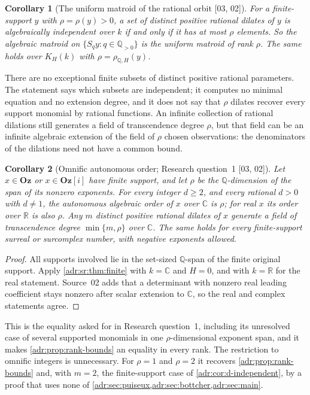 \documentclass[11pt,letterpaper]{article}
\numberwithin{equation}{section}
\newtheorem{corollary}[corollary]{Corollary}
\theoremstyle{definition}
\theoremstyle{remark}
\newcommand{\Oz}{\mathbf{Oz}}
\newcommand{\Goz}{\mathbf{Oz}[i]}
\newcommand{\C}{\mathbb C}
\newcommand{\R}{\mathbb R}
\newcommand{\Q}{\mathbb Q}
\newcommand{\src}[1]{\textup{[#1]}}%
\begin{document}
\begin{corollary}[The uniform matroid of the rational orbit \src{03, 02}]
\label{adr:sr:cor:uniform}
For a finite-support $y$ with $\rho=\rho(y)>0$, a set of distinct positive
rational dilates of $y$ is algebraically independent over $k$ if and only if
it has at most $\rho$ elements. So the algebraic matroid on
$\{S_qy:q\in\Q_{>0}\}$ is the uniform matroid of rank $\rho$. The same holds
over $K_H(k)$ with $\rho=\rho_{\Q,H}(y)$.
\end{corollary}

There are no exceptional finite subsets of distinct positive rational
parameters. The statement says which subsets are independent; it computes no
minimal equation and no extension degree, and it does not say that $\rho$
dilates recover every support monomial by rational functions. An infinite
collection of rational dilations still generates a field of transcendence
degree $\rho$, but that field can be an infinite algebraic extension of the
field of $\rho$ chosen observations: the denominators of the dilations need
not have a common bound.

\begin{corollary}[Omnific autonomous order; Research question~1 \src{03, 02}]
\label{adr:sr:cor:omnific}
Let $x\in\Oz$ or $x\in\Goz$ have finite support, and let $\rho$ be the
$\Q$-dimension of the span of its nonzero exponents. For every integer
$d\ge2$, and every rational $d>0$ with $d\ne1$, the autonomous algebraic order
of $x$ over $\C$ is $\rho$; for real $x$ its order over $\R$ is also $\rho$.
Any $m$ distinct positive rational dilates of $x$ generate a field of
transcendence degree $\min\{m,\rho\}$ over $\C$. The same holds for every
finite-support surreal or surcomplex number, with negative exponents allowed.
\end{corollary}
\begin{proof}
All supports involved lie in the set-sized $\Q$-span of the finite original
support. Apply \cref{adr:sr:thm:finite} with $k=\C$ and $H=0$, and with
$k=\R$ for the real statement. Source~02 adds that a determinant with nonzero
real leading coefficient stays nonzero after scalar extension to $\C$, so the
real and complex statements agree.
\end{proof}

This is the equality asked for in Research question~1, including its
unresolved case of several supported monomials in one $\rho$-dimensional
exponent span, and it makes \cref{adr:prop:rank-bounds} an equality in every
rank. The restriction to omnific integers is unnecessary. For $\rho=1$ and
$\rho=2$ it recovers \cref{adr:prop:rank-bounds} and, with $m=2$, the
finite-support case of \cref{adr:cor:d-independent}, by a proof that uses none
of \cref{adr:sec:puiseux,adr:sec:bottcher,adr:sec:main}.
\end{document}
